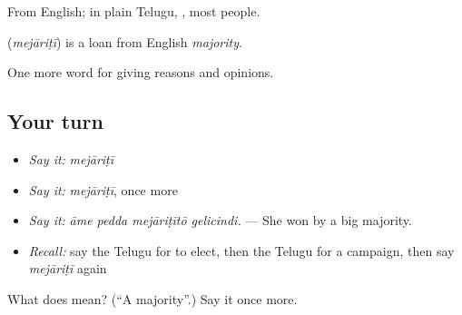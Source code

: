 From English; in plain Telugu,  , most people.

\begin{cousinweb}
\textbf{} (\emph{mejāriṭī}) is a loan from English \emph{majority}.
\end{cousinweb}

\begin{grammarlens}[title={What you've built}]
One more word for giving reasons and opinions.
\end{grammarlens}

\subsection*{Your turn}
\begin{itemize}
\raggedright
  \item \emph{Say it:} \emph{mejāriṭī}
  \item \emph{Say it:} \emph{mejāriṭī}, once more
  \item \emph{Say it:} \emph{āme pedda mejāriṭītō gelicindi.} — She won by a big majority.
  \item \emph{Recall:} say the Telugu for to elect, then the Telugu for a campaign, then say \emph{mejāriṭī} again
\end{itemize}

\begin{tcolorbox}[breakable,colback=teal!4,colframe=teal!35!black,title={Before you move on}]
What does  mean? (\textquotedblleft{}A majority\textquotedblright{}.) Say it once more.
\end{tcolorbox}
